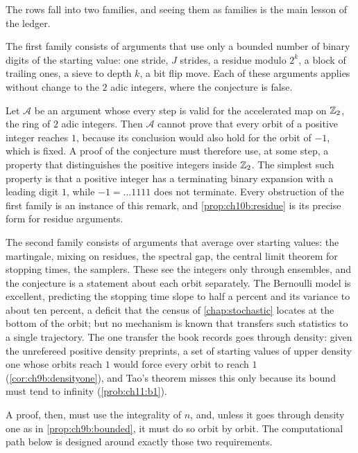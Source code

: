 The rows fall into two families, and seeing them as families is the main
lesson of the ledger.

The first family consists of arguments that use only a bounded number of binary
digits of the starting value: one stride, $J$ strides, a residue modulo $2^k$,
a block of trailing ones, a sieve to depth $k$, a bit flip move. Each of these
arguments applies without change to the $2$ adic integers, where the
conjecture is false.

\begin{remark}\label{rem:ch10d:integrality}
Let $\mathcal A$ be an argument whose every step is valid for the accelerated
map on $\mathbb{Z}_2$, the ring of $2$ adic integers. Then $\mathcal A$ cannot prove
that every orbit of a positive integer reaches $1$, because its conclusion
would also hold for the orbit of $-1$, which is fixed. A proof of the
conjecture must therefore use, at some step, a property that distinguishes the
positive integers inside $\mathbb{Z}_2$. The simplest such property is that a positive
integer has a terminating binary expansion with a leading digit $1$, while
$-1=\dots1111$ does not terminate. Every obstruction of the first family is an
instance of this remark, and \cref{prop:ch10b:residue} is its precise form
for residue arguments.
\end{remark}

The second family consists of arguments that average over starting values:
the martingale, mixing on residues, the spectral gap, the central limit
theorem for stopping times, the samplers. These see the integers only through
ensembles, and the conjecture is a statement about each orbit separately. The
Bernoulli model is excellent, predicting the stopping time slope to half a
percent and its variance to about ten percent, a deficit that the census of \cref{chap:stochastic} locates at the bottom of the orbit; but
no mechanism is known that transfers such statistics to a single trajectory.
The one transfer the book records goes through density: given the unrefereed positive density preprints, a set of starting values of upper density one whose orbits reach $1$ would force every orbit to reach $1$ (\cref{cor:ch9b:densityone}), and Tao's theorem misses this only because its bound must tend to infinity (\cref{prob:ch11:b1}).

A proof, then, must use the integrality of $n$, and, unless it goes through density one as in \cref{prop:ch9b:bounded}, it must do so orbit by orbit.
The computational path below is designed around exactly those two
requirements.

